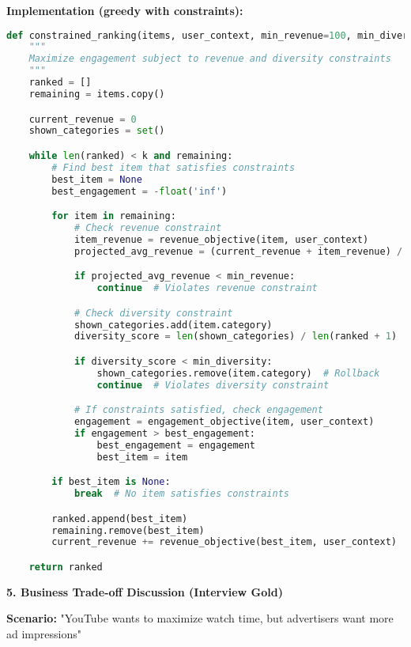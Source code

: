 \documentclass[10pt]{article}
\begin{document}
\textbf{Implementation (greedy with constraints):}
\begin{lstlisting}[language=Python]
def constrained_ranking(items, user_context, min_revenue=100, min_diversity=0.5, k=50):
    """
    Maximize engagement subject to revenue and diversity constraints
    """
    ranked = []
    remaining = items.copy()

    current_revenue = 0
    shown_categories = set()

    while len(ranked) < k and remaining:
        # Find best item that satisfies constraints
        best_item = None
        best_engagement = -float('inf')

        for item in remaining:
            # Check revenue constraint
            item_revenue = revenue_objective(item, user_context)
            projected_avg_revenue = (current_revenue + item_revenue) / (len(ranked) + 1)

            if projected_avg_revenue < min_revenue:
                continue  # Violates revenue constraint

            # Check diversity constraint
            shown_categories.add(item.category)
            diversity_score = len(shown_categories) / len(ranked + 1)

            if diversity_score < min_diversity:
                shown_categories.remove(item.category)  # Rollback
                continue  # Violates diversity constraint

            # If constraints satisfied, check engagement
            engagement = engagement_objective(item, user_context)
            if engagement > best_engagement:
                best_engagement = engagement
                best_item = item

        if best_item is None:
            break  # No item satisfies constraints

        ranked.append(best_item)
        remaining.remove(best_item)
        current_revenue += revenue_objective(best_item, user_context)

    return ranked
\end{lstlisting}

\textbf{5. Business Trade-off Discussion (Interview Gold)}

\textbf{Scenario:} "YouTube wants to maximize watch time, but advertisers want more ad impressions"
\end{document}
